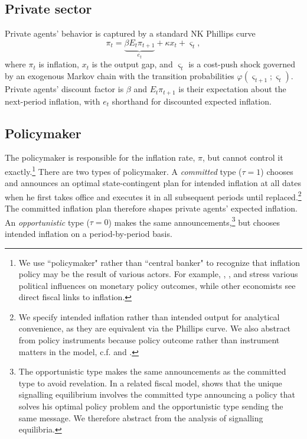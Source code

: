 \documentclass[12pt,letter,leqno]{article}
\theoremstyle{asn}
\theoremstyle{lem}
\theoremstyle{slem}
\theoremstyle{prop}
\theoremstyle{appprop}
\theoremstyle{rem}
\theoremstyle{defn}
\begin{document}
\subsection{Private sector}

Private agents' behavior is captured by a standard NK Phillips curve 
\begin{equation}
\pi _{t}=\underset{e_{t}}{\underbrace{\beta E_{t}\pi _{t+1}}}+\kappa
x_{t}+\varsigma _{t},  \label{PC}
\end{equation}%
where $\pi_t$ is inflation, $x_t$ is the output gap, and $\varsigma _{t}$
is a cost-push shock governed by an exogenous Markov chain with the
transition probabilities $\varphi \left( \varsigma _{t+1};\varsigma
_{t}\right).$ Private agents' discount factor is $\beta$ and $E_{t}\pi _{t+1}$
is their expectation about the next-period inflation, with $e_{t}$ shorthand for discounted expected inflation. 
%

\subsection{Policymaker}

The policymaker is responsible for the inflation rate, $\pi $, but cannot control it exactly.\footnote{%
We use ``policymaker" rather than ``central banker" to
recognize that inflation policy may be the result of various actors. For
example, \cite{de_long_americas_1996},  \cite{levin_falling_2010}, and \cite{meltzer_history_2014} stress various political influences on monetary
policy outcomes, while other economists see direct fiscal links to inflation.} There are two types of policymaker. A \textit{committed} type ($\tau=1$) chooses and announces an optimal state-contingent 
plan for intended inflation at all dates when he first takes office and executes it in all subsequent
periods until replaced.\footnote{%
We specify intended inflation rather than intended output for analytical convenience, as they are equivalent via the Phillips curve. We also abstract from policy instruments because policy outcome rather than instrument matters in the model, c.f. \cite{faust_transparency_2001} and \cite{sargent_conquest_1999}.} The committed inflation plan therefore shapes private agents' expected inflation. An \textit{opportunistic} type ($\tau=0$) makes the same announcements,\footnote{The opportunistic type makes the same announcements as the committed type to avoid revelation. In a related fiscal model,  \cite{lu_optimal_2013} shows that the unique signalling equilibrium involves the committed type announcing a policy
that solves his optimal policy problem and the opportunistic type sending the same
message. We therefore abstract from the analysis of signalling equilibria.} but chooses intended inflation on a period-by-period basis. 
\end{document}
